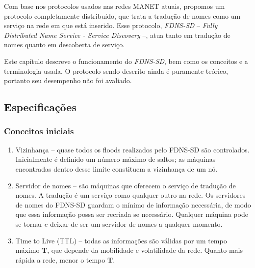 
Com base nos protocolos usados nas redes MANET atuais, propomos um protocolo
completamente distribuído, que trata a tradução de nomes como um serviço na rede
em que está inserido. Esse protocolo, \textit{FDNS-SD} -- 
\textit{Fully Distributed Name Service - Service Discovery} --, atua tanto em
tradução de nomes quanto em descoberta de serviço.

Este capítulo descreve o funcionamento do \textit{FDNS-SD}, bem como os conceitos
e a terminologia usada. O protocolo sendo descrito ainda é puramente teórico,
portanto seu desempenho não foi avaliado.

\subsection{Especificações}
    \subsubsection{Conceitos iniciais}
        \begin{enumerate}
            \item Vizinhança -- quase todos os floods realizados pelo FDNS-SD são
            controlados. Inicialmente é definido um número máximo de saltos; as
            máquinas  encontradas dentro desse limite constituem a vi\-zi\-nhan\-ça
            de um nó.
            \item Servidor de nomes -- são máquinas que oferecem o serviço de
            tradução de nomes. A tradução é um serviço como qualquer outro na rede.
            Os servidores de nomes do FDNS-SD guardam o mínimo de informação
            necessária, de modo que essa informação possa ser recriada se necessário.
            Qualquer máquina pode se tornar e deixar de ser um servidor de nomes
            a qualquer momento.
            \item Time to Live (TTL) -- todas as informações são válidas por um 
            tempo máximo \textbf{T}, que depende da mobilidade e volatilidade da
            rede. Quanto mais rápida a rede, menor o tempo \textbf{T}.
        \end{enumerate}
        

